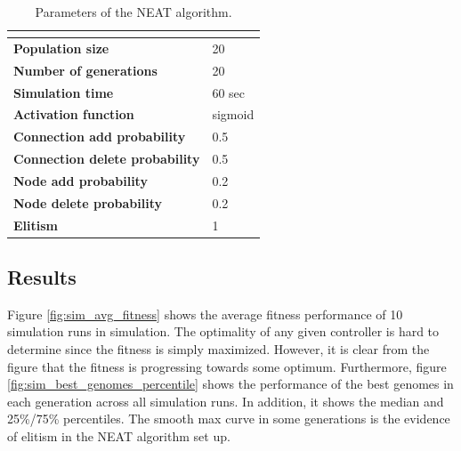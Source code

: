 \begin{table}[H]
\centering
\begin{tabular}{ll}
\hline
\textbf{}                      & \textbf{} \\ \hline
\textbf{Population size}       & 20        \\
\textbf{Number of generations} & 20        \\
\textbf{Simulation time}       & 60 sec    \\
\textbf{Activation function}             & sigmoid       \\
\textbf{Connection add probability}              & 0.5       \\
\textbf{Connection delete probability}              & 0.5       \\
\textbf{Node add probability}              & 0.2       \\
\textbf{Node delete probability}              & 0.2       \\
\textbf{Elitism}  & 1      
\end{tabular}
\caption{Parameters of the NEAT algorithm.}
\label{tab:neat_parameters}
\end{table}


\subsection{Results}

Figure \ref{fig:sim_avg_fitness} shows the average fitness performance of 10 simulation runs in simulation. The optimality of any given controller is hard to determine since the fitness is simply maximized. However, it is clear from the figure that the fitness is progressing towards some optimum. Furthermore, figure \ref{fig:sim_best_genomes_percentile} shows the performance of the best genomes in each generation across all simulation runs. In addition, it shows the median and 25\%/75\% percentiles. The smooth max curve in some generations is the evidence of elitism in the NEAT algorithm set up. 


